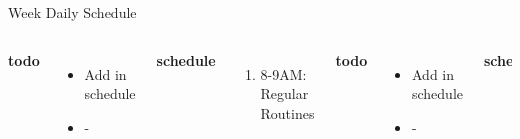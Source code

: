 \documentclass[serif, mathserif, final]{beamer}
\begin{document}
\begin{frame}
\begin{columns}
\begin{column}{0.5\linewidth}
\begin{block}{Week Daily Schedule}
\begin{columns}
        {\small \bf todo}\\ 
        \begin{itemize}
          \tiny \item \tiny Add in schedule
        \item \tiny -
        \end{itemize} 
        \textbf{\small schedule}\\
        \begin{enumerate} 
          \tiny \item \tiny 8-9AM: Regular Routines 
        \end{enumerate} 
        \small{\bf todo}\\ 
        \begin{itemize}
          \tiny \item \tiny Add in schedule
        \item \tiny -
        \end{itemize} 
        {\small \bf schedule}\\
        \begin{enumerate} 
          \tiny \item \tiny 8-9AM: Regular Routines 
        \end{enumerate} 


\end{columns}
\end{block}
\end{column}
\end{columns}
\end{frame}
\end{document}
